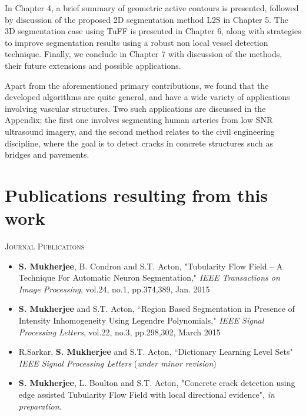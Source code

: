 In Chapter 4, a brief summary of geometric active contours is presented, followed by discussion of the proposed 2D segmentation method L2S in Chapter 5. The 3D segmentation case using TuFF is presented in Chapter 6, along with strategies to improve segmentation results using a robust non local vessel detection technique.  Finally, we conclude in Chapter 7 with discussion of the methods, their future extensions and possible applications.

Apart from the aforementioned primary contributions, we found that the developed algorithms are quite general, and have a wide variety of applications involving vascular structures. Two such applications are discussed in the Appendix; the first one involves segmenting human arteries from low SNR ultrasound imagery, and the second method relates to the civil engineering discipline, where the goal is to detect cracks in concrete structures such as bridges and pavements.

\section{Publications resulting from this work}

\textsc{Journal Publications}
\begin{itemize}
\item 
\textbf{S. Mukherjee}, B. Condron and S.T. Acton, "Tubularity Flow Field – A Technique For Automatic Neuron Segmentation," \textit{IEEE Transactions on Image Processing}, vol.24, no.1, pp.374,389, Jan. 2015

\item
\textbf{S. Mukherjee} and S.T. Acton, ``Region Based Segmentation in Presence of Intensity Inhomogeneity Using Legendre Polynomials," \textit{IEEE Signal Processing Letters}, vol.22, no.3, pp.298,302, March 2015

\item
R.Sarkar, \textbf{S. Mukherjee} and S.T. Acton, ``Dictionary Learning Level Sets" \textit{IEEE Signal Processing Letters} (\textit{under minor revision})

\item
\textbf{S. Mukherjee}, L. Boulton and S.T. Acton, "Concrete crack detection using edge assisted Tubularity Flow Field with local directional evidence", \textit{in preparation}.
\end{itemize}

